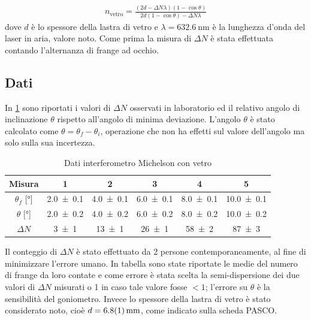 \documentclass[a4paper]{article}
\begin{document}
\begin{align}
    n_{\text{vetro}} = \frac{(2d - \Delta N \lambda)(1 - \cos\theta)}{2d(1 - \cos\theta) - \Delta N \lambda}
\label{eq:indice-rifrazione-vetro}
\end{align}
dove $d$ è lo spessore della lastra di vetro e $\lambda=\SI{632.6}{\nano\meter}$ è la lunghezza d'onda del laser in aria, valore noto.
Come prima la misura di $\Delta N$ è stata effettuata contando l'alternanza di frange ad occhio.
\subsection{Dati}
In \cref{tab:valori-michelson-vetro} sono riportati i valori di $\Delta N$ osservati in laboratorio ed il relativo angolo di inclinazione $\theta$ rispetto all'angolo di minima deviazione. L'angolo $\theta$ è stato calcolato come $\theta = \theta_f - \theta_i$, operazione che non ha effetti sul valore dell'angolo ma solo sulla sua incertezza.

\begin{table}[htbp]
\centering
\caption{Dati interferometro Michelson con vetro}
\label{tab:valori-michelson-vetro}
\begin{tabular}{cccccc}
\toprule
Misura & 1 & 2 & 3 & 4 & 5 \\
\midrule
$\theta_f$ [\si{\degree}] & \num{2.0 \pm 0.1} & \num{4.0 \pm 0.1} & \num{6.0 \pm 0.1} & \num{8.0 \pm 0.1} & \num{10.0 \pm 0.1} \\
$\theta$ [\si{\degree}] & \num{2.0 \pm 0.2} & \num{4.0 \pm 0.2} & \num{6.0 \pm 0.2} & \num{8.0 \pm 0.2} & \num{10.0 \pm 0.2} \\
$\Delta N$ & \num{3 \pm 1} & \num{13 \pm 1} & \num{26 \pm 1} & \num{58 \pm 2} & \num{87 \pm 3} \\
\bottomrule
\end{tabular}
\end{table}

Il conteggio di $\Delta N$ è stato effettuato da 2 persone contemporaneamente, al fine di minimizzare l'errore umano. In tabella sono state riportate le medie del numero di frange da loro contate e come errore è stata scelta la semi-dispersione dei due valori di $\Delta N$ misurati o 1 in caso tale valore fosse $<1$; l'errore su $\theta$ è la sensibilità del goniometro. Invece lo spessore della lastra di vetro è stato considerato noto, cioè $d=\SI{6.8 \pm 0.1}{\milli\meter}$, come indicato sulla scheda PASCO.
\end{document}
